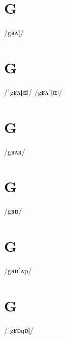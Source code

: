 \documentclass[10pt,a4paper,twoside]{book}
\begin{document}
\section*{G}

\begin{multicols}{3}
 {/gʁʌɭ/} {}
\end{multicols}

\section*{G}

\begin{multicols}{3}
 {/ˈgʁʌɭɶǀ/} {}
 {/gʁʌˈɭɶǀ/} {}
\end{multicols}

\section*{G}

\begin{multicols}{3}
 {/gʁʌʁ/} {}
\end{multicols}

\section*{G}

\begin{multicols}{3}
 {/gʁɒ/} {}
\end{multicols}

\section*{G}

\begin{multicols}{3}
 {/gʁɒˈʌp/} {}
\end{multicols}

\section*{G}

\begin{multicols}{3}
 {/ˈgʁɒŋɒɭ/} {}
\end{multicols}
\end{document}
